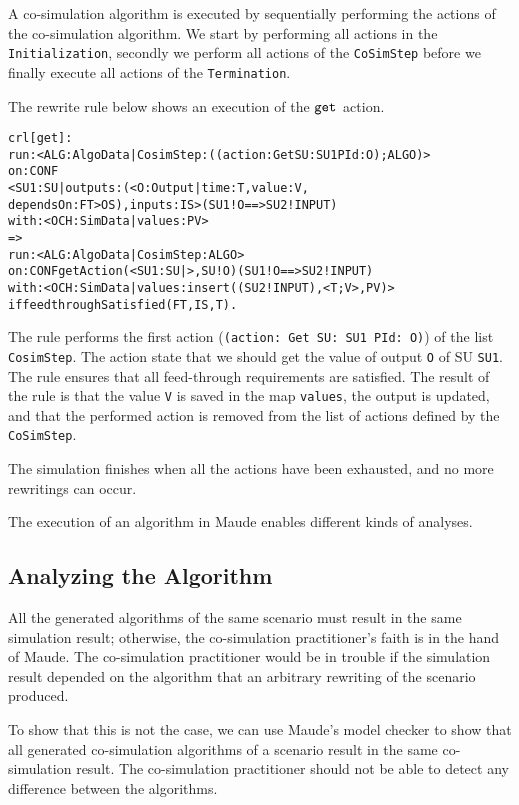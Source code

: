 A co-simulation algorithm is executed by sequentially performing the actions of the co-simulation algorithm.
We start by performing all actions in the \texttt{Initialization}, secondly we perform all actions of the \texttt{CoSimStep} before we finally execute all actions of the \texttt{Termination}. 

The rewrite rule below shows an execution of the $\mathtt{get}_{}$ action.
\small
\begin{alltt}
crl [get] : 
run: < ALG : AlgoData | CosimStep : ((action: Get SU: SU1 PId: O) ; ALGO) >
on: CONF
< SU1 : SU | outputs : (< O : Output | time : T, value : V, 
  dependsOn : FT > OS), inputs : IS > ( SU1 ! O ==> SU2 ! INPUT)
with: < OCH : SimData | values : PV >
=> 
run: < ALG : AlgoData | CosimStep : ALGO >
on: CONF getAction(< SU1 : SU | >, SU ! O) ( SU1 ! O ==> SU2 ! INPUT)
with: < OCH : SimData | values : insert((SU2 ! INPUT), < T ; V >, PV) > 
if feedthroughSatisfied(FT, IS, T) .
\end{alltt}
\normalsize
The rule performs the first action (\texttt{(action: Get SU: SU1 PId: O)}) of the list \texttt{CosimStep}.
The action state that we should get the value of output \texttt{O} of SU \texttt{SU1}.
The rule ensures that all feed-through requirements are satisfied.
The result of the rule is that the value \texttt{V} is saved in the map \texttt{values}, the output is updated, and that the performed action is removed from the list of actions defined by the \texttt{CoSimStep}.

The simulation finishes when all the actions have been exhausted, and no more rewritings can occur.

The execution of an algorithm in Maude enables different kinds of analyses.

\subsection{Analyzing the Algorithm}
All the generated algorithms of the same scenario must result in the same simulation result; otherwise, the co-simulation practitioner's faith is in the hand of Maude.
The co-simulation practitioner would be in trouble if the simulation result depended on the algorithm that an arbitrary rewriting of the scenario produced.

To show that this is not the case, we can use Maude's model checker to show that all generated co-simulation algorithms of a scenario result in the same co-simulation result.
The co-simulation practitioner should not be able to detect any difference between the algorithms.

